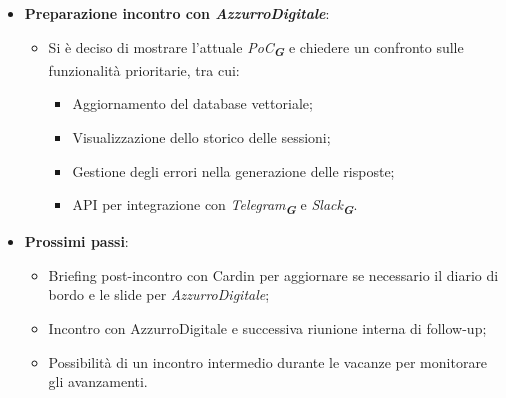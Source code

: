 \begin{itemize}
    \item \textbf{Preparazione incontro con \emph{AzzurroDigitale}}:  
    \begin{itemize}
        \item Si è deciso di mostrare l'attuale \emph{PoC}\textsubscript{\textit{\textbf{G}}} e chiedere un confronto sulle funzionalità prioritarie, tra cui:  
        \begin{itemize}
            \item Aggiornamento del database vettoriale;
            \item Visualizzazione dello storico delle sessioni;
            \item Gestione degli errori nella generazione delle risposte;
            \item API per integrazione con \emph{Telegram}\textsubscript{\textit{\textbf{G}}} e \emph{Slack}\textsubscript{\textit{\textbf{G}}}.  
        \end{itemize}
    \end{itemize}
    \item \textbf{Prossimi passi}:  
    \begin{itemize}
        \item Briefing post-incontro con Cardin per aggiornare se necessario il diario di bordo e le slide per \emph{AzzurroDigitale};
        \item Incontro con AzzurroDigitale e successiva riunione interna di follow-up;
        \item Possibilità di un incontro intermedio durante le vacanze per monitorare gli avanzamenti.  
    \end{itemize}
\end{itemize}
